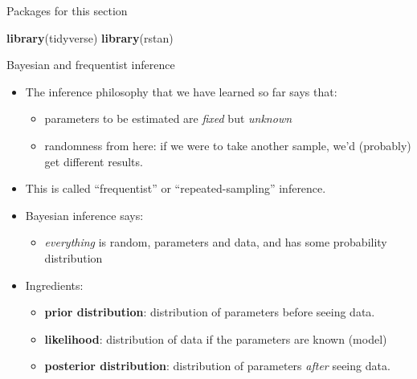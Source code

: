 \documentclass[ignorenonframetext,]{beamer}
\newenvironment{Shaded}{\begin{snugshade}}{\end{snugshade}}
\newcommand{\KeywordTok}[1]{\textcolor[rgb]{0.13,0.29,0.53}{\textbf{#1}}}
\newcommand{\NormalTok}[1]{#1}
\providecommand{\tightlist}{%
  \setlength{\itemsep}{0pt}\setlength{\parskip}{0pt}}
\begin{document}
\begin{frame}[fragile]{Packages for this section}
\protect\hypertarget{packages-for-this-section-11}{}

\begin{Shaded}
\begin{Highlighting}[]
\KeywordTok{library}\NormalTok{(tidyverse)}
\KeywordTok{library}\NormalTok{(rstan)}
\end{Highlighting}
\end{Shaded}

\end{frame}

\begin{frame}{Bayesian and frequentist inference}
\protect\hypertarget{bayesian-and-frequentist-inference}{}

\begin{itemize}
\tightlist
\item
  The inference philosophy that we have learned so far says that:

  \begin{itemize}
  \tightlist
  \item
    parameters to be estimated are \emph{fixed} but \emph{unknown}
  \item
    randomness from here: if we were to take another sample, we'd
    (probably) get different results.
  \end{itemize}
\item
  This is called ``frequentist'' or ``repeated-sampling'' inference.
\item
  Bayesian inference says:

  \begin{itemize}
  \tightlist
  \item
    \emph{everything} is random, parameters and data, and has some
    probability distribution
  \end{itemize}
\item
  Ingredients:

  \begin{itemize}
  \tightlist
  \item
    \textbf{prior distribution}: distribution of parameters before
    seeing data.
  \item
    \textbf{likelihood}: distribution of data if the parameters are
    known (model)
  \item
    \textbf{posterior distribution}: distribution of parameters
    \emph{after} seeing data.
  \end{itemize}
\end{itemize}

\end{frame}
\end{document}
